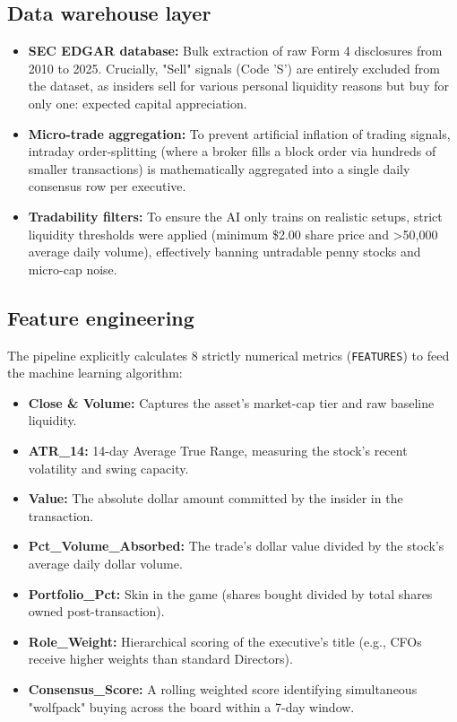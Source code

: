 \documentclass{article}
\begin{document}
\subsection{Data warehouse layer}
\begin{itemize}
    \item \textbf{SEC EDGAR database:} Bulk extraction of raw Form 4 disclosures from 2010 to 2025. Crucially, "Sell" signals (Code 'S') are entirely excluded from the dataset, as insiders sell for various personal liquidity reasons but buy for only one: expected capital appreciation.
    \item \textbf{Micro-trade aggregation:} To prevent artificial inflation of trading signals, intraday order-splitting (where a broker fills a block order via hundreds of smaller transactions) is mathematically aggregated into a single daily consensus row per executive.
    \item \textbf{Tradability filters:} To ensure the AI only trains on realistic setups, strict liquidity thresholds were applied (minimum \$2.00 share price and >50,000 average daily volume), effectively banning untradable penny stocks and micro-cap noise.
\end{itemize}

\subsection{Feature engineering}
The pipeline explicitly calculates 8 strictly numerical metrics (\texttt{FEATURES}) to feed the machine learning algorithm:
\begin{itemize}
    \item \textbf{Close \& Volume:} Captures the asset's market-cap tier and raw baseline liquidity.
    \item \textbf{ATR\_14:} 14-day Average True Range, measuring the stock's recent volatility and swing capacity.
    \item \textbf{Value:} The absolute dollar amount committed by the insider in the transaction.
    \item \textbf{Pct\_Volume\_Absorbed:} The trade's dollar value divided by the stock's average daily dollar volume.
    \item \textbf{Portfolio\_Pct:} Skin in the game (shares bought divided by total shares owned post-transaction).
    \item \textbf{Role\_Weight:} Hierarchical scoring of the executive's title (e.g., CFOs receive higher weights than standard Directors).
    \item \textbf{Consensus\_Score:} A rolling weighted score identifying simultaneous "wolfpack" buying across the board within a 7-day window.
\end{itemize}
\end{document}
